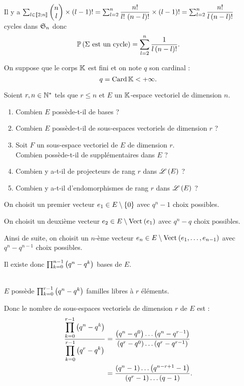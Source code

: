 \begin{corr}[3]~\\
Il y a \(\sum_{l\in\interventierii{2}{n}}\binom{l}{n}\times\paren{l-1}!=\sum_{l=2}^n\dfrac{n!}{l!\,\paren{n-l}!}\times\paren{l-1}!=\sum_{l=2}^n\dfrac{n!}{l\paren{n-l}!}\) cycles dans \(\S{n}\) donc \[\proba{\Sigma\text{ est un cycle}}=\sum_{l=2}^n\dfrac{1}{l\paren{n-l}!}.\]
\end{corr}

\begin{exo}
On suppose que le corps \(\K\) est fini et on note \(q\) son cardinal : \[q=\Card\K<\pinf.\]

Soient \(r,n\in\Ns\) tels que \(r\leq n\) et \(E\) un \(\K\)-espace vectoriel de dimension \(n\).

\begin{enumerate}
    \item Combien \(E\) possède-t-il de bases ? \\
    \item Combien \(E\) possède-t-il de sous-espaces vectoriels de dimension \(r\) ? \\
    \item Soit \(F\) un sous-espace vectoriel de \(E\) de dimension \(r\). \\ Combien possède-t-il de supplémentaires dans \(E\) ? \\
    \item Combien y a-t-il de projecteurs de rang \(r\) dans \(\Lendo{E}\) ? \\
    \item Combien y a-t-il d'endomorphismes de rang \(r\) dans \(\Lendo{E}\) ?
\end{enumerate}
\end{exo}

\begin{corr}[1]
On choisit un premier vecteur \(e_1\in E\excluant\accol{0}\) avec \(q^n-1\) choix possibles.

On choisit un deuxième vecteur \(e_2\in E\excluant\Vect{e_1}\) avec \(q^n-q\) choix possibles.

Ainsi de suite, on choisit un \(n\)-ème vecteur \(e_n\in E\excluant\Vect{e_1,\dots,e_{n-1}}\) avec \(q^n-q^{n-1}\) choix possibles.

Il existe donc \(\prod_{k=0}^{n-1}\paren{q^n-q^k}\) bases de \(E\).
\end{corr}

\begin{corr}[2]~\\
\(E\) possède \(\prod_{k=0}^{r-1}\paren{q^n-q^k}\) familles libres à \(r\) éléments.

Donc le nombre de sous-espaces vectoriels de dimension \(r\) de \(E\) est : \[\begin{aligned}
\dfrac{\ds\prod_{k=0}^{r-1}\paren{q^n-q^k}}{\ds\prod_{k=0}^{r-1}\paren{q^r-q^k}}&=\dfrac{\paren{q^n-q^0}\dots\paren{q^n-q^{r-1}}}{\paren{q^r-q^0}\dots\paren{q^r-q^{r-1}}} \\
&=\dfrac{\paren{q^n-1}\dots\paren{q^{n-r+1}-1}}{\paren{q^r-1}\dots\paren{q-1}}.
\end{aligned}\]
\end{corr}


